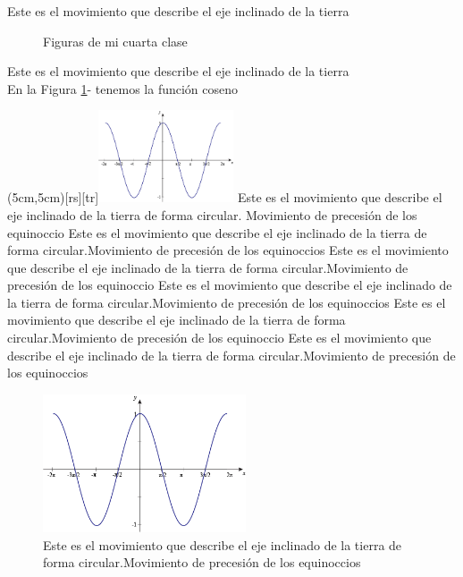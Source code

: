\documentclass{report}
\begin{document}
Este es el movimiento que describe el eje inclinado de la tierra
\begin{figure}
	\centering
{}\qquad
{}
\caption{Figuras de mi cuarta clase}\label{f1}
\end{figure}

Este es el movimiento que describe el eje inclinado de la tierra	\\

En la Figura \ref{f1}- tenemos la función coseno
	
	
\clearpage
\parpic(5cm,5cm)[rs][tr]{\includegraphics[width=4cm]{cos}}	
Este es el movimiento que describe el eje inclinado de la tierra de forma circular. Movimiento de precesión de los equinoccio
Este es el movimiento que describe el eje inclinado de la tierra de forma circular.Movimiento de precesión de los equinoccios
Este es el movimiento que describe el eje inclinado de la tierra de forma circular.Movimiento de precesión de los equinoccio
Este es el movimiento que describe el eje inclinado de la tierra de forma circular.Movimiento de precesión de los equinoccios
Este es el movimiento que describe el eje inclinado de la tierra de forma circular.Movimiento de precesión de los equinoccio
Este es el movimiento que describe el eje inclinado de la tierra de forma circular.Movimiento de precesión de los equinoccios


\begin{figure}
	\centering
\includegraphics[width=6cm]{cos}
\caption{Este es el movimiento que describe el eje inclinado de la tierra de forma circular.Movimiento de precesión de los equinoccios}	
\end{figure}
\end{document}
